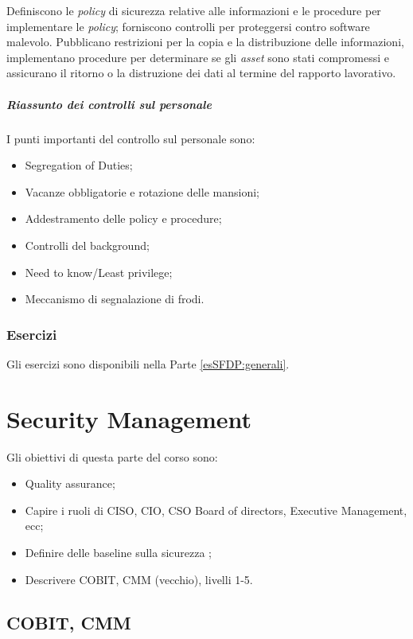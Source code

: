Definiscono le \textit{policy} di sicurezza relative alle informazioni e le
procedure per implementare le \textit{policy}; forniscono controlli per
proteggersi contro software malevolo. Pubblicano restrizioni per la copia e la
distribuzione delle informazioni, implementano procedure per determinare se
gli \textit{asset} sono stati compromessi e assicurano il ritorno o la
distruzione dei dati al termine del rapporto lavorativo.

\subsubsection{Riassunto dei controlli sul personale}

I punti importanti del controllo sul personale sono:
\begin{itemize}
\item Segregation of Duties;
\item Vacanze obbligatorie e rotazione delle mansioni;
\item Addestramento delle policy e procedure;
\item Controlli del background;
\item Need to know/Least privilege;
\item Meccanismo di segnalazione di frodi.
\end{itemize}

\section{Esercizi}

Gli esercizi sono disponibili nella Parte \ref{esSFDP:generali}.

\part{Security Management}
\label{SM}

Gli obiettivi di questa parte del corso sono:
\begin{itemize}
\item Quality assurance;
\item Capire i ruoli di CISO, CIO, CSO Board of directors, Executive
Management, ecc;
\item Definire delle baseline sulla sicurezza ;
\item Descrivere COBIT, CMM (vecchio), livelli 1-5.
\end{itemize}

\chapter{COBIT, CMM}

